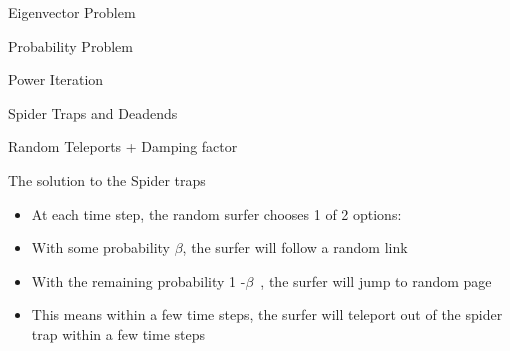 \documentclass{beamer}
\begin{document}

\begin{frame}[t]{Eigenvector Problem}

\end{frame}

\begin{frame}[t]{Probability Problem}

\end{frame}

\begin{frame}[t]{Power Iteration}

\end{frame}

\begin{frame}[t]{Spider Traps and Deadends}

\end{frame}

\begin{frame}[t]{Random Teleports + Damping factor}
    
\end{frame}

\begin{frame}[t]{The solution to the Spider traps}
    \begin{itemize}
        \item At each time step, the random surfer chooses 1 of 2 options:
        \item With some probability $\beta$, the surfer will follow a random link
        \item With the remaining probability 1 -$\beta$ , the surfer will jump to random page
        \item This means within a few time steps, the surfer will teleport out of the spider trap within a few time steps
    \end{itemize}
\end{frame}
    
\end{document}
